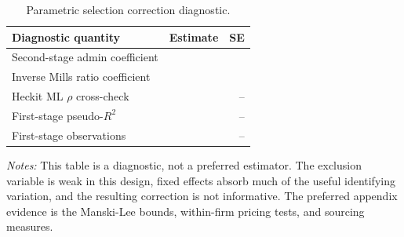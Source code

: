 \begin{table}[ht]
\centering
\caption{Parametric selection correction diagnostic.}
\label{tab:utg_heckman}
\begin{threeparttable}
\begin{tabular}{lrr}
\toprule
Diagnostic quantity & Estimate & SE \\
\midrule
Second-stage admin coefficient & \BPutgHeckmanCoef{} & \BPutgHeckmanSE{} \\
Inverse Mills ratio coefficient & \BPutgHeckmanLambda{} & \BPutgHeckmanLambdaSE{} \\
Heckit ML $\rho$ cross-check & \BPutgHeckmanRho{} & -- \\
First-stage pseudo-$R^2$ & \BPutgFirstStagePseudoR{} & -- \\
First-stage observations & \BPutgFirstStageN{} & -- \\
\bottomrule
\end{tabular}
\begin{tablenotes}[flushleft]\footnotesize
\item \textit{Notes:} This table is a diagnostic, not a preferred estimator. The exclusion variable is weak in this design, fixed effects absorb much of the useful identifying variation, and the resulting correction is not informative. The preferred appendix evidence is the Manski-Lee bounds, within-firm pricing tests, and sourcing measures.
\end{tablenotes}
\end{threeparttable}
\end{table}
